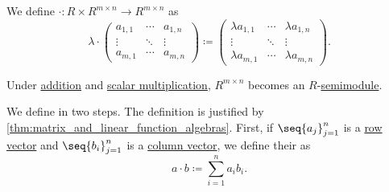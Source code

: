 \begin{proposition}
\begin{thmenum}
     We define  \( \cdot: R \times R^{m \times n} \to R^{m \times n} \) as
    \begin{equation*}
       \lambda \cdot \begin{pmatrix}
        a_{1,1} & \cdots & a_{1,n} \\
        \vdots  & \ddots & \vdots  \\
        a_{m,1} & \cdots & a_{m,n}
      \end{pmatrix}
      \coloneqq
      \begin{pmatrix}
        \lambda a_{1,1} & \cdots & \lambda a_{1,n} \\
        \vdots          & \ddots & \vdots          \\
        \lambda a_{m,1} & \cdots & \lambda a_{m,n}
      \end{pmatrix}.
    \end{equation*}

    Under \hyperref[thm:matrix_algebra/addition]{addition} and \hyperref[thm:matrix_algebra/scalar_multiplication]{scalar multiplication}, \( R^{m \times n} \) becomes an \( R \)-\hyperref[def:semimodule]{semimodule}.

     We define  in two steps. The definition is justified by \cref{thm:matrix_and_linear_function_algebras}. First, if \( \seq{ a_j }_{j=1}^n \) is a \hyperref[def:array/row_vector]{row vector} and \( \seq{ b_i }_{j=1}^n \) is a \hyperref[def:array/column_vector]{column vector}, we define their  as
    \begin{equation*}
      a \cdot b \coloneqq \sum_{i=1}^n a_i b_i.
    \end{equation*}


\end{thmenum}
\end{proposition}
